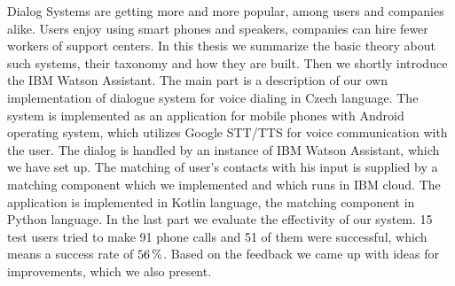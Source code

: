 \documentclass[12pt]{report}
\begin{document}

Dialog Systems are getting more and more popular, among users and companies alike.
Users enjoy using smart phones and speakers, companies can hire fewer workers of
support centers. In this thesis we summarize the basic theory about such systems,
their taxonomy and how they are built. Then we shortly introduce the IBM Watson Assistant.
The main part is a description of our own implementation of dialogue system for voice
dialing in Czech language. The system is implemented as an application for mobile
phones with Android operating system, which utilizes Google STT/TTS
for voice communication with the user. The dialog is handled by an instance of IBM Watson Assistant,
which we have set up. The matching of user's contacts with his input is supplied
by a matching component which we implemented and which runs in IBM cloud. The application
is implemented in Kotlin language, the matching component in Python language.
In the last part we evaluate the effectivity of our system. 15 test users tried to make
91 phone calls and 51 of them were successful,
which means a success rate of \(56\,\rm \%\). Based on the feedback we came up
with ideas for improvements, which we also present.
\end{document}
